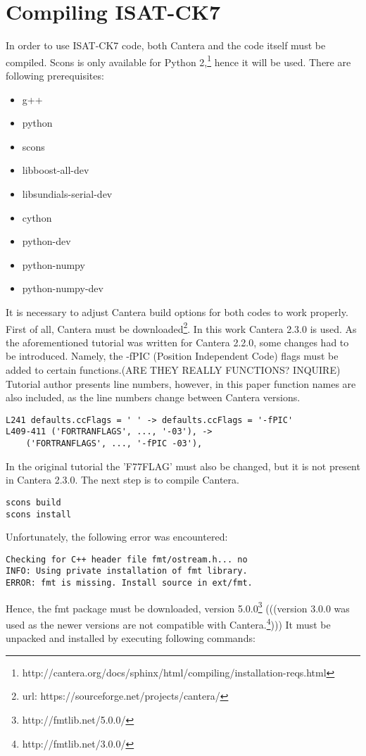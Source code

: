 \documentclass[12pt,english]{article}
\begin{document}
\section{Compiling ISAT-CK7}
In order to use ISAT-CK7 code, both Cantera and the code itself must be compiled. Scons is only available for Python 2,\footnote{http://cantera.org/docs/sphinx/html/compiling/installation-reqs.html} hence it will be used. There are following prerequisites:
\begin{itemize}
\item g++
\item python
\item scons
\item libboost-all-dev
\item libsundials-serial-dev
\item cython
\item python-dev
\item python-numpy
\item python-numpy-dev
\end{itemize}
It is necessary to adjust Cantera build options for both codes to work properly. First of all, Cantera must be downloaded\footnote{url: https://sourceforge.net/projects/cantera/}. In this work Cantera 2.3.0 is used. As the aforementioned tutorial was written for Cantera 2.2.0, some changes had to be introduced. Namely, the -fPIC (Position Independent Code) flags must be added to certain functions.(ARE THEY REALLY FUNCTIONS? INQUIRE) Tutorial author presents line numbers, however, in this paper function names are also included, as the line numbers change between Cantera versions.
\begin{lstlisting}
L241 defaults.ccFlags = ' ' -> defaults.ccFlags = '-fPIC'
L409-411 ('FORTRANFLAGS', ..., '-03'), -> 
	('FORTRANFLAGS', ..., '-fPIC -03'),
\end{lstlisting}
In the original tutorial the 'F77FLAG' must also be changed, but it is not present in Cantera 2.3.0. The next step is to compile Cantera.
\begin{lstlisting}
scons build
scons install
\end{lstlisting}
Unfortunately, the following error was encountered:
\begin{lstlisting}
Checking for C++ header file fmt/ostream.h... no
INFO: Using private installation of fmt library.
ERROR: fmt is missing. Install source in ext/fmt.
\end{lstlisting}
Hence, the fmt package must be downloaded,
version 5.0.0\footnote{http://fmtlib.net/5.0.0/} (((version 3.0.0 was used as the newer versions are not compatible with Cantera.\footnote{http://fmtlib.net/3.0.0/}))) It must be unpacked and installed by executing following commands:
\end{document}
